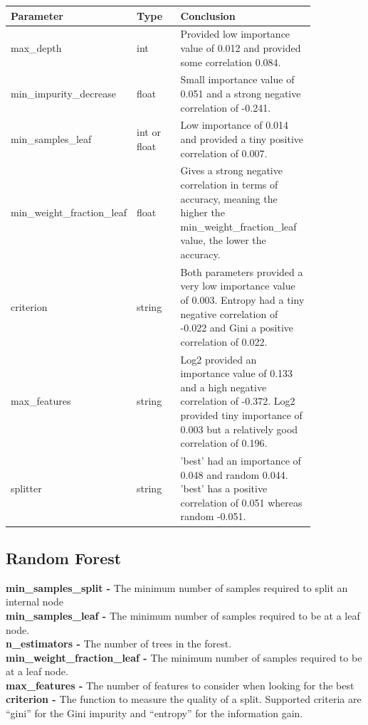 \documentclass[11pt]{article}
\begin{document}
\begin{table}[ht]
  \centering
  \begin{tabular}{|p{0.25\linewidth} | p{0.15 \linewidth} | p{0.45\linewidth}|} 
    \hline
    \textbf{Parameter}  & \textbf{Type} &\textbf{Conclusion} \\ \hline
    max\_depth & int & Provided low importance value of 0.012 and provided some correlation 0.084. \\ \hline
    min\_impurity\_decrease & float & Small importance value of 0.051 and a strong negative correlation of -0.241.  \\ \hline
    min\_samples\_leaf & int or float & Low importance of 0.014 and provided a tiny positive correlation of 0.007. \\ \hline
    min\_weight\_fraction\_leaf & float & Gives a strong negative correlation in terms of accuracy, meaning the higher the min\_weight\_fraction\_leaf value, the lower the accuracy.\\ \hline
    criterion & string & Both parameters provided a very low importance value of 0.003. Entropy had a tiny negative correlation of -0.022 and Gini a positive correlation of 0.022. \\ \hline
    max\_features & string & Log2 provided an importance value of 0.133 and a high negative correlation of -0.372. Log2 provided tiny importance of 0.003 but a relatively good correlation of 0.196. \\ \hline
    splitter & string & 'best' had an importance of 0.048 and random 0.044. 'best' has a positive correlation of 0.051 whereas random -0.051. \\ \hline
  \end{tabular}
\end{table}\label{RF_Analysis_Table}


\newpage
\subsection{Random Forest}
\textbf{min\_samples\_split -} The minimum number of samples required to split an internal node \\
\textbf{min\_samples\_leaf -} The minimum number of samples required to be at a leaf node.  \\
\textbf{n\_estimators -} The number of trees in the forest.\\
\textbf{min\_weight\_fraction\_leaf -} The minimum number of samples required to be at a leaf node. \\
\textbf{max\_features -} The number of features to consider when looking for the best \\
\textbf{criterion -} The function to measure the quality of a split. Supported criteria are “gini” for the Gini impurity and “entropy” for the information gain. \\
\end{document}
